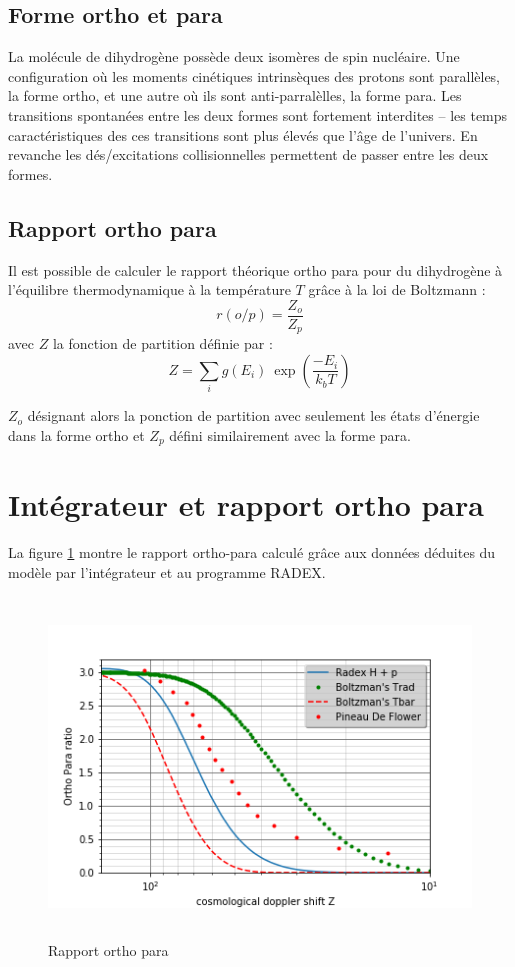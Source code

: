 \documentclass[10pt, a4paper]{report}
\numberwithin{equation}{subsection}
\begin{document}
\subsection{Forme ortho et para}
La molécule de dihydrogène possède deux isomères de spin nucléaire. Une configuration où les moments cinétiques intrinsèques des protons sont parallèles, la forme ortho, et une autre où ils sont anti-parralèlles, la forme para. Les transitions spontanées entre les deux formes sont fortement interdites -- les temps caractéristiques des ces transitions sont plus élevés que l'âge de l'univers. En revanche les dés/excitations collisionnelles permettent de passer entre les deux formes.
\subsection{Rapport ortho para}
Il est possible de calculer le rapport théorique ortho para pour du dihydrogène à l'équilibre thermodynamique à la température $T$ grâce à la loi de Boltzmann :
\begin{equation} \label{eq:EROP}
\boxed{r(o/p) = \frac{Z_o}{Z_p}}
\end{equation}
avec $Z$ la fonction de partition définie par :
\begin{equation} \label{eq:EZ}
 \boxed{Z = \sum\limits_i g(E_i) \ \exp\left(\frac{-E_i}{k_bT}\right)}
\end{equation}
 
$Z_o$ désignant alors la ponction de partition avec seulement les états d'énergie dans la forme ortho et $Z_p$ défini similairement avec la forme para.


\section{Intégrateur et rapport ortho para}

La figure \ref{fig:ROP} montre le rapport ortho-para calculé grâce aux données déduites du modèle par l'intégrateur et au programme RADEX.
\begin{figure}[]
\centering
\includegraphics[width=14.0cm,height=9cm]{rop.png}
\caption{Rapport ortho para}
\label{fig:ROP}
\end{figure}
\end{document}
